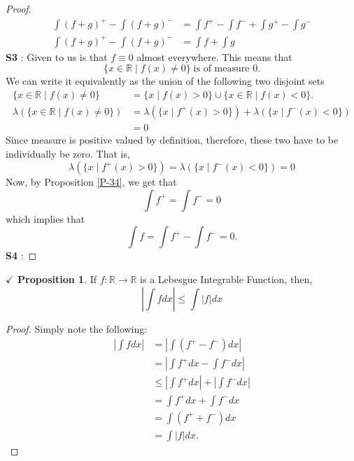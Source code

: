\documentclass{article}
\theoremstyle{definition}
\theoremstyle{remark}
\theoremstyle{definition}
\theoremstyle{definition}
\newtheorem{proposition}{$\checkmark$ Proposition}
\theoremstyle{definition}
\newcommand{\abs}[1]{\left \vert #1\right \vert}
\newcommand{\union}{\cup}
\newcommand{\where}{\;\vert\;}
\newcommand{\R}{\mathbb{R}}
\newcommand{\lm}[1]{\lambda\left (#1\right )}
\begin{document}
\begin{proof}
\begin{align*}
\int	(f+g)^{+} -\int (f+g)^{-} &=  \int f^{+}  - \int f^{-}+ \int g^{+} - \int g^{-}\\
\int	(f+g)^{+} -\int (f+g)^{-} &=  \int f + \int g
\end{align*}
\textbf{S3} : Given to us is that $ f \equiv  0 $ almost everywhere. This means that 
\[\{x\in \R \where f(x) \neq 0\} \;\text{is of measure }0.\]
We can write it equivalently as the union of the following two disjoint sets
\begin{align*}
	\{x\in \R \where f(x) \neq 0\} &= \{x\where f(x) > 0\} \union \{x\in \R \where f(x) < 0\}.\\
	\lm{	\{x\in \R \where f(x) \neq 0\}}&=  \lm{\{x\where f^{+}(x) > 0\}} + \lm{\{x\where f^{-}(x) < 0\}}\\
	&= 0
\end{align*}
Since measure is positive valued by definition, therefore, these two have to be individually be zero. That is,
\[\lm{\{x\where f^{+}(x) > 0\}} = \lm{\{x\where f^{-}(x) < 0\}} = 0\]
Now, by Proposition \ref{P-34}, we get that
\[\int f^{+} = \int f^{-} = 0\]
which implies that
\[\int f = \int f^{+} - \int f^{-} = 0.\]
\textbf{S4} : 
\end{proof}
\hrulefill
\begin{proposition}
	If $ f : \R \to \R $ is a Lebesgue Integrable Function, then,
	\[\abs{\int fdx} \le \int \abs{f} dx\]
\end{proposition}
\begin{proof}
Simply note the following:
\begin{align*}
	\abs{\int fdx} &= \abs{\int \left ( f^{+} - f^{-}\right )dx}\\
	&= \abs{\int f^{+}dx - \int f^{-}dx}\\
	&\le \abs{\int f^{+}dx} + \abs{\int f^{-}dx}\\
	&= \int f^{+} dx + \int f^{-}dx\\
	&= \int \left (f^{+} + f^{-}\right )dx\\
	&= \int \abs{f}dx.
\end{align*}	
\end{proof}
\hrulefill
\newpage
\end{document}
